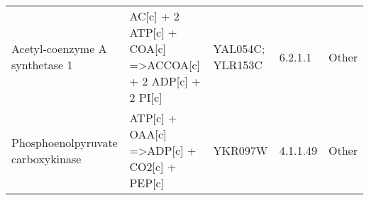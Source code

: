 {\begin{landscape}
\begin{longtable}{p{.25\linewidth} | p{.40\linewidth} | p{.19\linewidth} | p{.05\linewidth} | p{.10\linewidth}}
Acetyl-coenzyme A synthetase 1                                                            & AC{[}c{]} + 2 ATP{[}c{]} + COA{[}c{]} =\textgreater ACCOA{[}c{]} + 2 ADP{[}c{]} + 2 PI{[}c{]}                                                   & YAL054C; YLR153C                                                                                                                                                 & 6.2.1.1            & Other                                                                       \\
Phosphoenolpyruvate carboxykinase                                                         & ATP{[}c{]} + OAA{[}c{]} =\textgreater ADP{[}c{]} + CO2{[}c{]} + PEP{[}c{]}                                                                      & YKR097W                                                                                                                                                          & 4.1.1.49           & Other                                                                      \\ \hline
\end{longtable}
\end{landscape}  }
